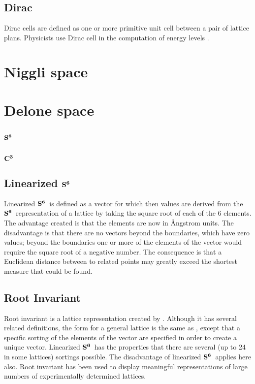 \documentclass[preprint]{iucr}              %
\numberwithin{equation}{section}
\newcommand{\SVI}[0]{$\bf{S^{6}}$}
\newcommand{\CIII}[0]{$\bf{C^{3}}$}
\begin{document}
\subsection{Dirac}
\label{dirac}

Dirac cells are defined as one or more primitive unit cell
between a pair of lattice plans. Physicists use Dirac
cell in the computation of energy levels \cite{dirac1930principles}.

\section{Niggli space}

\section{Delone space}

\subsection{\SVI}
\label{s6}

\subsection{\CIII}
\label{c3}

\subsection{Linearized \SVI}
\label{ls}
Linearized \SVI~is defined as a vector for which then
values are derived from the \SVI~representation of a 
lattice by taking the square root of each of the
6 elements. The advantage created is that the elements
are now in {\AA}ngstrom units. The disadvantage is that 
there are no vectors beyond the boundaries, which have zero 
values; beyond the boundaries one or more of the elements
of the vector would require the square root of a negative
number. The consequence is that a Euclidean distance 
between to related points may greatly exceed the
shortest measure that could be found.

\subsection{Root Invariant}
\label{ri}
Root invariant is a lattice representation created by
\cite{bright2021welcome}. Although it has several related
definitions, the form for a general lattice is the 
same as \ls, except that a specific sorting of the elements of
the vector are specified in order to create a unique
vector. Linearized \SVI~has the properties that there
are several (up to 24 in some lattices) sortings possible.
The disadvantage of linearized \SVI~applies here also. Root
invariant has been used to display meaningful representations 
of large numbers of experimentally determined lattices.
\end{document}

